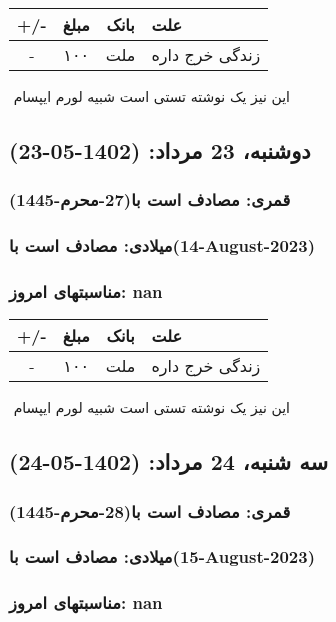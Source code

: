 \documentclass{article}
\newcommand{\rnote}[1]{\marginpar{\textcolor{color}{\StrSubstitute{\##1}{ }{\_}}}}
\newcommand{\myRow}[4]{
    #1 & #2 & #3 & #4 \\ \hline
}
\begin{document}
\begin{tabular}{ | c | c | c | p{5cm} |}
    \hline
    \myRow{ +/- }{مبلغ}{بانک}{علت}
    \myRow{-}{۱۰۰}{ملت}{زندگی خرج داره}
\end{tabular}
\newline
\newline

‌
\rnote{تست}
این نیز یک نوشته تستی است شبیه لورم ایپسام




\newpage
{}
\textcolor{color}{
\section{ دوشنبه، 23 مرداد: (1402-05-23) }
\subsubsection*{قمری: مصادف است با(27-محرم-1445)} 
\subsubsection*{میلادی: مصادف است با(14-August-2023)}
\subsubsection*{مناسبتهای امروز: nan}
}


\begin{tabular}{ | c | c | c | p{5cm} |}
    \hline
    \myRow{ +/- }{مبلغ}{بانک}{علت}
    \myRow{-}{۱۰۰}{ملت}{زندگی خرج داره}
\end{tabular}
\newline
\newline

‌
\rnote{تست}
این نیز یک نوشته تستی است شبیه لورم ایپسام




\newpage
{}
\textcolor{color}{
\section{ سه شنبه، 24 مرداد: (1402-05-24) }
\subsubsection*{قمری: مصادف است با(28-محرم-1445)} 
\subsubsection*{میلادی: مصادف است با(15-August-2023)}
\subsubsection*{مناسبتهای امروز: nan}
}
\end{document}
